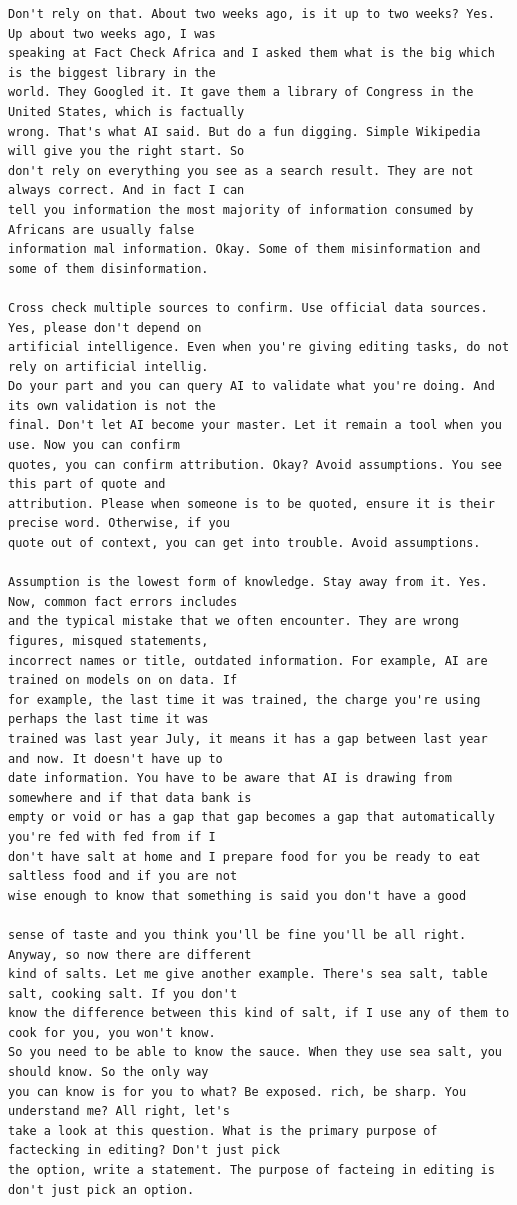 {\begin{Verbatim}
Don't rely on that. About two weeks ago, is it up to two weeks? Yes. Up about two weeks ago, I was
speaking at Fact Check Africa and I asked them what is the big which is the biggest library in the
world. They Googled it. It gave them a library of Congress in the United States, which is factually
wrong. That's what AI said. But do a fun digging. Simple Wikipedia will give you the right start. So
don't rely on everything you see as a search result. They are not always correct. And in fact I can
tell you information the most majority of information consumed by Africans are usually false
information mal information. Okay. Some of them misinformation and some of them disinformation.

Cross check multiple sources to confirm. Use official data sources. Yes, please don't depend on
artificial intelligence. Even when you're giving editing tasks, do not rely on artificial intellig.
Do your part and you can query AI to validate what you're doing. And its own validation is not the
final. Don't let AI become your master. Let it remain a tool when you use. Now you can confirm
quotes, you can confirm attribution. Okay? Avoid assumptions. You see this part of quote and
attribution. Please when someone is to be quoted, ensure it is their precise word. Otherwise, if you
quote out of context, you can get into trouble. Avoid assumptions.

Assumption is the lowest form of knowledge. Stay away from it. Yes. Now, common fact errors includes
and the typical mistake that we often encounter. They are wrong figures, misqued statements,
incorrect names or title, outdated information. For example, AI are trained on models on on data. If
for example, the last time it was trained, the charge you're using perhaps the last time it was
trained was last year July, it means it has a gap between last year and now. It doesn't have up to
date information. You have to be aware that AI is drawing from somewhere and if that data bank is
empty or void or has a gap that gap becomes a gap that automatically you're fed with fed from if I
don't have salt at home and I prepare food for you be ready to eat saltless food and if you are not
wise enough to know that something is said you don't have a good

sense of taste and you think you'll be fine you'll be all right. Anyway, so now there are different
kind of salts. Let me give another example. There's sea salt, table salt, cooking salt. If you don't
know the difference between this kind of salt, if I use any of them to cook for you, you won't know.
So you need to be able to know the sauce. When they use sea salt, you should know. So the only way
you can know is for you to what? Be exposed. rich, be sharp. You understand me? All right, let's
take a look at this question. What is the primary purpose of factecking in editing? Don't just pick
the option, write a statement. The purpose of facteing in editing is don't just pick an option.


\end{Verbatim}}
